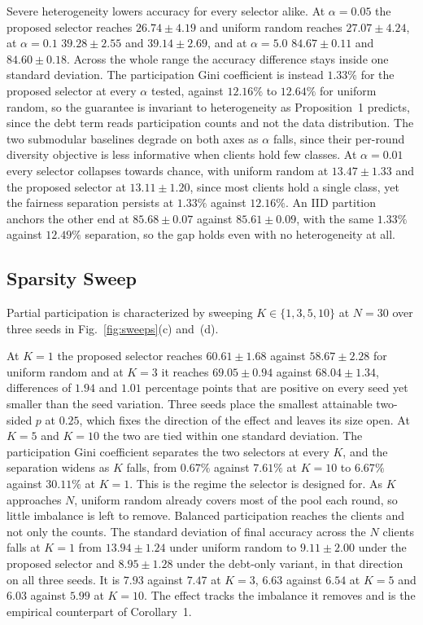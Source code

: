 \documentclass[journal]{IEEEtran}
\newcommand{\rev}[1]{#1}
\begin{document}
\rev{Severe heterogeneity lowers accuracy for every selector alike. At $\alpha = 0.05$ the proposed selector reaches $26.74 \pm 4.19$ and uniform random reaches $27.07 \pm 4.24$, at $\alpha = 0.1$ $39.28 \pm 2.55$ and $39.14 \pm 2.69$, and at $\alpha = 5.0$ $84.67 \pm 0.11$ and $84.60 \pm 0.18$. Across the whole range the accuracy difference stays inside one standard deviation. The participation Gini coefficient is instead $1.33\%$ for the proposed selector at every $\alpha$ tested, against $12.16\%$ to $12.64\%$ for uniform random, so the guarantee is invariant to heterogeneity as Proposition~1 predicts, since the debt term reads participation counts and not the data distribution. The two submodular baselines degrade on both axes as $\alpha$ falls, since their per-round diversity objective is less informative when clients hold few classes. At $\alpha = 0.01$ every selector collapses towards chance, with uniform random at $13.47 \pm 1.33$ and the proposed selector at $13.11 \pm 1.20$, since most clients hold a single class, yet the fairness separation persists at $1.33\%$ against $12.16\%$. An IID partition anchors the other end at $85.68 \pm 0.07$ against $85.61 \pm 0.09$, with the same $1.33\%$ against $12.49\%$ separation, so the gap holds even with no heterogeneity at all.}

\subsection{Sparsity Sweep}
\label{ssec:exp-sparsity}

\rev{Partial participation is characterized by sweeping $K \in \{1, 3, 5, 10\}$ at $N = 30$ over three seeds in Fig.~\ref{fig:sweeps}(c) and~(d).}



\rev{At $K = 1$ the proposed selector reaches $60.61 \pm 1.68$ against $58.67 \pm 2.28$ for uniform random and at $K = 3$ it reaches $69.05 \pm 0.94$ against $68.04 \pm 1.34$, differences of $1.94$ and $1.01$ percentage points that are positive on every seed yet smaller than the seed variation. Three seeds place the smallest attainable two-sided $p$ at $0.25$, which fixes the direction of the effect and leaves its size open. At $K = 5$ and $K = 10$ the two are tied within one standard deviation. The participation Gini coefficient separates the two selectors at every $K$, and the separation widens as $K$ falls, from $0.67\%$ against $7.61\%$ at $K = 10$ to $6.67\%$ against $30.11\%$ at $K = 1$. This is the regime the selector is designed for. As $K$ approaches $N$, uniform random already covers most of the pool each round, so little imbalance is left to remove.} \rev{Balanced participation reaches the clients and not only the counts. The standard deviation of final accuracy across the $N$ clients falls at $K = 1$ from $13.94 \pm 1.24$ under uniform random to $9.11 \pm 2.00$ under the proposed selector and $8.95 \pm 1.28$ under the debt-only variant, in that direction on all three seeds. It is $7.93$ against $7.47$ at $K = 3$, $6.63$ against $6.54$ at $K = 5$ and $6.03$ against $5.99$ at $K = 10$. The effect tracks the imbalance it removes and is the empirical counterpart of Corollary~1.}
\end{document}

